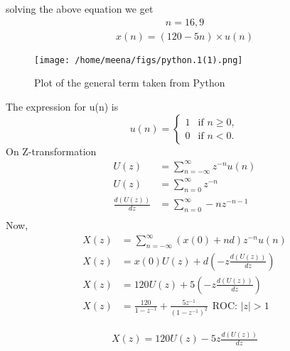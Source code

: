 \documentclass[journal,12pt,twocolumn]{IEEEtran}
\theoremstyle{remark}
\begin{document}
solving the above equation we get
\begin{align}
   n=16,9
\end{align}
\begin{align}
 \boxed{x(n)=(120-5n)\times u(n)}   
\end{align}
\begin{figure}[h]
  \centering
  \texttt{[image: /home/meena/figs/python.1(1).png]} 
  \captionsetup{justification=centering}
  \caption{Plot of the general term taken from Python}
  \label{fig:your_label}
\end{figure}
The expression for u(n) is 
\[ u(n) = \begin{cases}
    1 & \text{if } n \geq 0, \\
    0 & \text{if } n < 0.
\end{cases} \]
On Z-transformation
\begin{align}
U(z)&=\sum\limits_{n=-\infty}^{\infty}z^{-n}u(n)\\
U(z)&=\sum\limits_{n=0}^{\infty}z^{-n}\\
\frac{d(U(z))}{dz}&=\sum\limits_{n=0}^{\infty}-nz^{-n-1}\\
\end{align}
Now,
\begin{align}
   X(z)&=\sum\limits_{n=-\infty}^{\infty}(x(0)+nd)z^{-n}u(n)\\
   X(z)&=x(0)U(z)+d\left(-z\frac{d(U(z))}{dz}\right)\\
   X(z)&=120U(z)+5\left(-z\frac{d(U(z))}{dz}\right)\\
   X(z)&=\frac{120}{1-z^{-1}}+\frac{5z^{-1}}{(1-z^{-1})^2}\hspace{5pt}
   \text{ROC: $|z|>1$}
\end{align}

\begin{align}
 \boxed{X(z)=120U(z)-5z\frac{d(U(z))}{dz}}  
\end{align}
\end{document}
